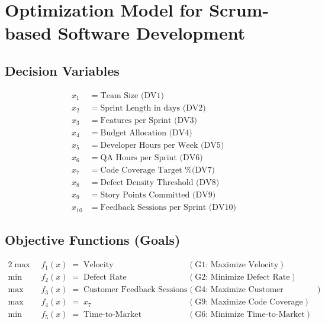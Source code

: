 \documentclass{article}
\begin{document}
\section*{Optimization Model for Scrum-based Software Development}

\subsection*{Decision Variables}
\begin{align*}
x_1 &\;=\; \text{Team Size (DV1)} \\
x_2 &\;=\; \text{Sprint Length in days (DV2)} \\
x_3 &\;=\; \text{Features per Sprint (DV3)} \\
x_4 &\;=\; \text{Budget Allocation (DV4)} \\
x_5 &\;=\; \text{Developer Hours per Week (DV5)} \\
x_6 &\;=\; \text{QA Hours per Sprint (DV6)} \\
x_7 &\;=\; \text{Code Coverage Target \% (DV7)} \\
x_8 &\;=\; \text{Defect Density Threshold (DV8)} \\
x_9 &\;=\; \text{Story Points Committed (DV9)} \\
x_{10} &\;=\; \text{Feedback Sessions per Sprint (DV10)}
\end{align*}

\subsection*{Objective Functions (Goals)}
\begin{alignat*}{2}
\max\; & f_1(x) \;=\; \text{Velocity}               &&\quad (\text{G1: Maximize Velocity}) \\
\min\; & f_2(x) \;=\; \text{Defect Rate}            &&\quad (\text{G2: Minimize Defect Rate}) \\
\max\; & f_3(x) \;=\; \text{Customer Feedback Sessions} &&\quad (\text{G4: Maximize Customer Feedback}) \\
\max\; & f_4(x) \;=\; x_7                            &&\quad (\text{G9: Maximize Code Coverage}) \\
\min\; & f_5(x) \;=\; \text{Time-to-Market}         &&\quad (\text{G6: Minimize Time-to-Market})
\end{alignat*}
\end{document}
